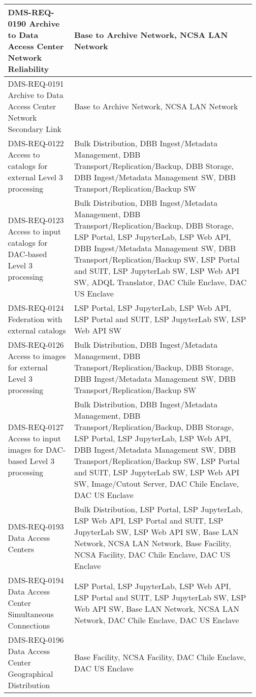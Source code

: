 \begin{longtable}{p{}p{}}
DMS-REQ-0190 Archive to Data Access Center Network Reliability & Base to Archive Network, NCSA LAN Network \\ \hline
DMS-REQ-0191 Archive to Data Access Center Network Secondary Link & Base to Archive Network, NCSA LAN Network \\ \hline
DMS-REQ-0122 Access to catalogs for external Level 3 processing & Bulk Distribution, DBB Ingest/Metadata Management, DBB Transport/Replication/Backup, DBB Storage, DBB Ingest/Metadata Management SW, DBB Transport/Replication/Backup SW \\ \hline
DMS-REQ-0123 Access to input catalogs for DAC-based Level 3 processing & Bulk Distribution, DBB Ingest/Metadata Management, DBB Transport/Replication/Backup, DBB Storage, LSP Portal, LSP JupyterLab, LSP Web API, DBB Ingest/Metadata Management SW, DBB Transport/Replication/Backup SW, LSP Portal and SUIT, LSP JupyterLab SW, LSP Web API SW, ADQL Translator, DAC Chile Enclave, DAC US Enclave \\ \hline
DMS-REQ-0124 Federation with external catalogs & LSP Portal, LSP JupyterLab, LSP Web API, LSP Portal and SUIT, LSP JupyterLab SW, LSP Web API SW \\ \hline
DMS-REQ-0126 Access to images for external Level 3 processing & Bulk Distribution, DBB Ingest/Metadata Management, DBB Transport/Replication/Backup, DBB Storage, DBB Ingest/Metadata Management SW, DBB Transport/Replication/Backup SW \\ \hline
DMS-REQ-0127 Access to input images for DAC-based Level 3 processing & Bulk Distribution, DBB Ingest/Metadata Management, DBB Transport/Replication/Backup, DBB Storage, LSP Portal, LSP JupyterLab, LSP Web API, DBB Ingest/Metadata Management SW, DBB Transport/Replication/Backup SW, LSP Portal and SUIT, LSP JupyterLab SW, LSP Web API SW, Image/Cutout Server, DAC Chile Enclave, DAC US Enclave \\ \hline
DMS-REQ-0193 Data Access Centers & Bulk Distribution, LSP Portal, LSP JupyterLab, LSP Web API, LSP Portal and SUIT, LSP JupyterLab SW, LSP Web API SW, Base LAN Network, NCSA LAN Network, Base Facility, NCSA Facility, DAC Chile Enclave, DAC US Enclave \\ \hline
DMS-REQ-0194 Data Access Center Simultaneous Connections & LSP Portal, LSP JupyterLab, LSP Web API, LSP Portal and SUIT, LSP JupyterLab SW, LSP Web API SW, Base LAN Network, NCSA LAN Network, DAC Chile Enclave, DAC US Enclave \\ \hline
DMS-REQ-0196 Data Access Center Geographical Distribution & Base Facility, NCSA Facility, DAC Chile Enclave, DAC US Enclave \\ \hline

\end{longtable}
